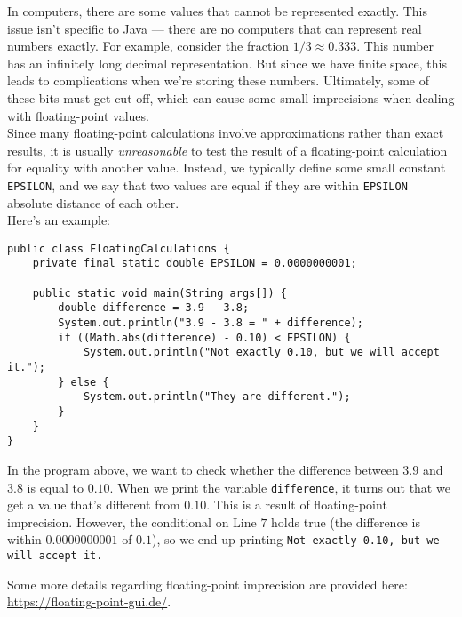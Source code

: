 In computers, there are some values that cannot be represented exactly. This issue isn't specific to Java --- there are no computers that can represent real numbers exactly. For example, consider the fraction $1/3 \approx 0.333$. This number has an infinitely long decimal representation. But since we have finite space, this leads to complications when we're storing these numbers. Ultimately, some of these bits must get cut off, which can cause some small imprecisions when dealing with floating-point values. \\

Since many floating-point calculations involve approximations rather than exact results, it is usually \textit{unreasonable} to test the result of a floating-point calculation for equality with another value. Instead, we typically define some small constant \verb!EPSILON!, and we say that two values are equal if they are within \verb!EPSILON! absolute distance of each other. \\

Here's an example:

\begin{lstlisting}
public class FloatingCalculations {
    private final static double EPSILON = 0.0000000001; 
    
    public static void main(String args[]) {
        double difference = 3.9 - 3.8;
        System.out.println("3.9 - 3.8 = " + difference);
        if ((Math.abs(difference) - 0.10) < EPSILON) {
            System.out.println("Not exactly 0.10, but we will accept it.");
        } else {
            System.out.println("They are different.");
        }
    }
}
\end{lstlisting}

\noindent In the program above, we want to check whether the difference between $3.9$ and $3.8$ is equal to $0.10$. When we print the variable \verb!difference!, it turns out that we get a value that's different from $0.10$. This is a result of floating-point imprecision. However, the conditional on Line $7$ holds true (the difference is within $0.0000000001$ of $0.1$), so we end up printing \verb!Not exactly 0.10, but we will accept it.!

Some more details regarding floating-point imprecision are provided here: \url{https://floating-point-gui.de/}. 


